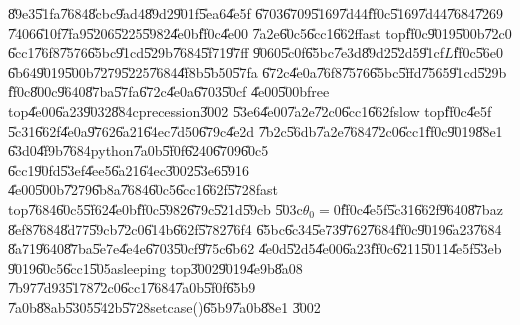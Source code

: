 \begin{case}
\U{89e3}\U{51fa}\U{7684}\U{8cbc}\U{9ad4}\U{89d2}\U{901f}\U{5ea6}\U{4e5f}%
\U{6703}\U{6709}\U{5169}\U{7d44}\U{ff0c}\U{5169}\U{7d44}\U{7684}\U{7269}%
\U{7406}\U{610f}\U{7fa9}\U{5206}\U{5225}\U{5982}\U{4e0b}\U{ff0c}\U{4e00}%
\U{7a2e}\U{60c5}\U{6cc1}\U{662f}fast top\U{ff0c}\U{9019}\U{500b}\U{72c0}%
\U{6cc1}\U{76f8}\U{7576}\U{65bc}\U{91cd}\U{529b}\U{7684}\U{5f71}\U{97ff}%
\U{9060}\U{5c0f}\U{65bc}\U{7e3d}\U{89d2}\U{52d5}\U{91cf}$L$\U{ff0c}\U{56e0}%
\U{6b64}\U{9019}\U{500b}\U{7279}\U{5225}\U{7684}\U{4f8b}\U{5b50}\U{57fa}%
\U{672c}\U{4e0a}\U{76f8}\U{7576}\U{65bc}\U{5ffd}\U{7565}\U{91cd}\U{529b}%
\U{ff0c}\U{800c}\U{9640}\U{87ba}\U{57fa}\U{672c}\U{4e0a}\U{6703}\U{50cf}%
\U{4e00}\U{500b}free top\U{4e00}\U{6a23}\U{9032}\U{884c}precession\U{3002}%
\U{53e6}\U{4e00}\U{7a2e}\U{72c0}\U{6cc1}\U{662f}slow top\U{ff0c}\U{4e5f}%
\U{5c31}\U{662f}\U{4e0a}\U{9762}\U{6a21}\U{64ec}\U{7d50}\U{679c}\U{4e2d}%
\U{7b2c}\U{56db}\U{7a2e}\U{7684}\U{72c0}\U{6cc1}\U{ff0c}\U{9019}\U{88e1}%
\U{63d0}\U{4f9b}\U{7684}python\U{7a0b}\U{5f0f}\U{6240}\U{6709}\U{60c5}%
\U{6cc1}\U{90fd}\U{53ef}\U{4ee5}\U{6a21}\U{64ec}\U{3002}\U{53e6}\U{5916}%
\U{4e00}\U{500b}\U{7279}\U{6b8a}\U{7684}\U{60c5}\U{6cc1}\U{662f}\U{5728}fast
top\U{7684}\U{60c5}\U{5f62}\U{4e0b}\U{ff0c}\U{5982}\U{679c}\U{521d}\U{59cb}%
\U{503c}$\theta _{0}=0$\U{ff0c}\U{4e5f}\U{5c31}\U{662f}\U{9640}\U{87ba}z%
\U{8ef8}\U{7684}\U{8d77}\U{59cb}\U{72c0}\U{614b}\U{662f}\U{5782}\U{76f4}%
\U{65bc}\U{6c34}\U{5e73}\U{9762}\U{7684}\U{ff0c}\U{9019}\U{6a23}\U{7684}%
\U{8a71}\U{9640}\U{87ba}\U{5e7e}\U{4e4e}\U{6703}\U{50cf}\U{975c}\U{6b62}%
\U{4e0d}\U{52d5}\U{4e00}\U{6a23}\U{ff0c}\U{6211}\U{5011}\U{4e5f}\U{53eb}%
\U{9019}\U{60c5}\U{6cc1}\U{505a}sleeping top\U{3002}\U{9019}\U{4e9b}\U{8a08}%
\U{7b97}\U{7d93}\U{5178}\U{72c0}\U{6cc1}\U{7684}\U{7a0b}\U{5f0f}\U{65b9}%
\U{7a0b}\U{88ab}\U{5305}\U{542b}\U{5728}setcase()\U{65b9}\U{7a0b}\U{88e1}%
\U{3002}
\end{case}

\bigskip

